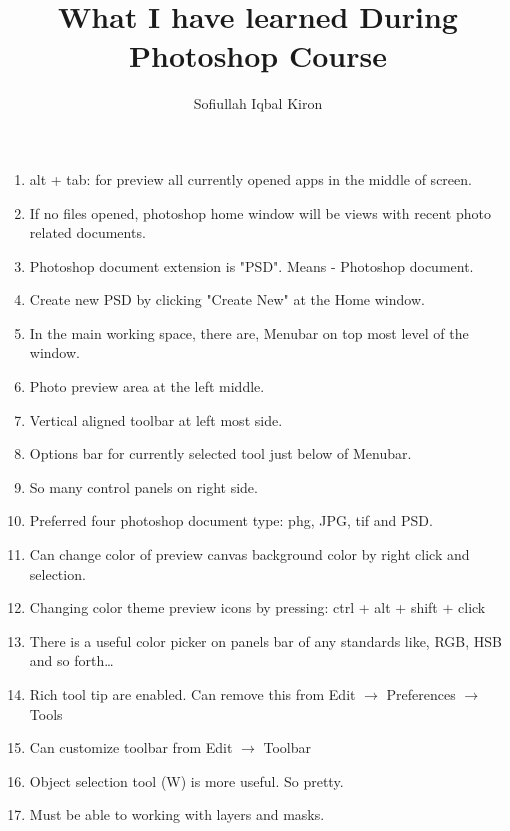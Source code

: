 \documentclass[11 pt]{article}
\title{What I have learned During Photoshop Course}
\author{Sofiullah Iqbal Kiron}
\begin{document}
\maketitle

\begin{enumerate}
	\item alt + tab: for preview all currently opened apps in the middle of screen.
	\item If no files opened, photoshop home window will be views with recent photo related documents.
	\item Photoshop document extension is "PSD". Means - Photoshop document.
	\item Create new PSD by clicking "Create New" at the Home window.
	\item In the main working space, there are, Menubar on top most level of the window.
	\item Photo preview area at the left middle.
	\item Vertical aligned toolbar at left most side.
	\item Options bar for currently selected tool just below of Menubar.
	\item So many control panels on right side.
	\item Preferred four photoshop document type: phg, JPG, tif and PSD.
	\item Can change color of preview canvas background color by right click and selection.
	\item Changing color theme preview icons by pressing: ctrl + alt + shift + click
	\item There is a useful color picker on panels bar of any standards like, RGB, HSB and so forth\dots
	\item Rich tool tip are enabled. Can remove this from Edit $\rightarrow$ Preferences $\rightarrow$ Tools
	\item Can customize toolbar from Edit $\rightarrow$ Toolbar
	\item Object selection tool (W) is more useful. So pretty.
	\item Must be able to working with layers and masks.
\end{enumerate}
\end{document}
